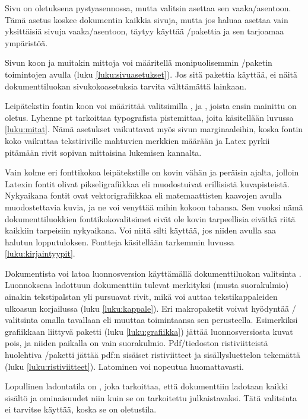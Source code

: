 Sivu on oletuksena pystyasennossa, mutta valitsin 
asettaa sen vaaka\-/asentoon. Tämä asetus koskee dokumentin kaikkia
sivuja, mutta jos haluaa asettaa vain yksittäisiä sivuja
vaaka\-/asentoon, täytyy käyttää
\-/pakettia ja sen tarjoamaa
ympäristöä.

Sivun koon ja muitakin mittoja voi määritellä monipuolisemmin
\-/paketin toimintojen avulla (luku
\ref{luku:sivuasetukset}). Jos sitä pakettia käyttää, ei näitä
dokumenttiluokan sivukokoasetuksia tarvita välttämättä lainkaan.

Leipätekstin fontin koon voi määrittää valitsimilla \koodim{10pt},
\koodim{11pt} ja \koodim{12pt}, joista ensin mainittu on oletus. Lyhenne
pt tarkoittaa typografista pistemittaa, joita käsitellään luvussa
\ref{luku:mitat}. Nämä asetukset vaikuttavat myös sivun marginaaleihin,
koska fontin koko vaikuttaa tekstiriville mahtuvien merkkien määrään ja
Latex pyrkii pitämään rivit sopivan mittaisina lukemisen kannalta.

Vain kolme eri fonttikokoa leipätekstille on kovin vähän ja peräisin
ajalta, jolloin Latexin fontit olivat pikseligrafiikkaa eli muodostuivat
erillisistä kuvapisteistä. Nykyaikana fontit ovat vektorigrafiikkaa eli
matemaattisten kaavojen avulla muodostettavia kuvia, ja ne voi venyttää
mihin kokoon tahansa. Sen vuoksi nämä dokumenttiluokkien
fonttikokovalitsimet eivät ole kovin tarpeellisia eivätkä riitä kaikkiin
tarpeisiin nykyaikana. Voi niitä silti käyttää, jos niiden avulla saa
halutun lopputuloksen. Fontteja käsitellään tarkemmin luvussa
\ref{luku:kirjaintyypit}.

Dokumentista voi latoa luonnosversion käyttämällä dokumenttiluokan
valitsinta . Luonnoksena ladottuun dokumenttiin tulevat
merkityksi (musta suorakulmio) ainakin tekstipalstan yli pursuavat
rivit, mikä voi auttaa tekstikappaleiden ulkoasun korjailussa (luku
\ref{luku:kappale}). Eri makropaketit voivat hyödyntää \-/
valitsinta omalla tavallaan eli muuttaa toimintaansa sen perusteella.
Esimerkiksi grafiikkaan liittyvä paketti  (luku
\ref{luku:grafiikka}) jättää luonnosversiosta kuvat pois, ja niiden
paikalla on vain suorakulmio. Pdf\-/tiedoston ristiviitteistä huolehtiva
\-/paketti jättää pdf:n sisäiset ristiviitteet ja
sisällysluettelon tekemättä (luku \ref{luku:ristiviitteet}). Latominen
voi nopeutua huomattavasti.

Lopullinen ladontatila on , joka tarkoittaa, että
dokumenttiin ladotaan kaikki sisältö ja ominaisuudet niin kuin se on
tarkoitettu julkaistavaksi. Tätä valitsinta ei tarvitse käyttää, koska
se on oletustila.

